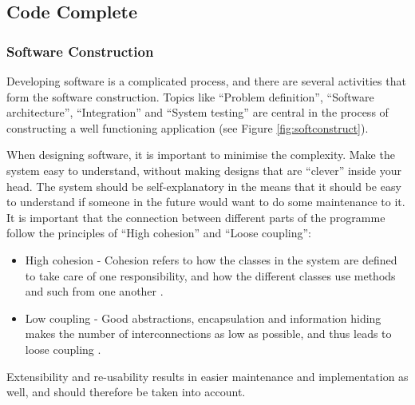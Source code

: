 \subsection{Code Complete}
\subsubsection{Software Construction}
\label{sec:softconstruct}
Developing software is a complicated process, and there are several activities that form the software construction. Topics like ``Problem definition'', ``Software architecture'', ``Integration'' and ``System testing'' are central in the process of constructing a well functioning application (see Figure \ref{fig:softconstruct}).


When designing software, it is important to minimise the complexity. Make the system easy to understand, without making designs that are ``clever'' inside your head. The system should be self-explanatory in the means that it should be easy to understand if someone in the future would want to do some maintenance to it. It is important that the connection between different parts of the programme follow the principles of ``High cohesion'' and ``Loose coupling'':
\begin{itemize}
    \item High cohesion - Cohesion refers to how the classes in the system are defined to take care of one responsibility, and how the different classes use methods and such from one another \cite{adamcarlson}.
    \item Low coupling - Good abstractions, encapsulation and information hiding makes the number of interconnections as low as possible, and thus leads to loose coupling \cite{adamcarlson}.
\end{itemize}
Extensibility and re-usability results in easier maintenance and implementation as well, and should therefore be taken into account. 

